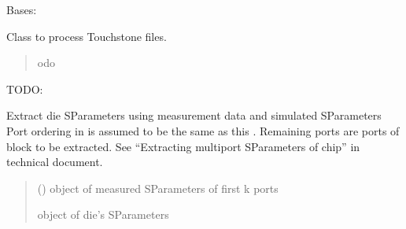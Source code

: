 \documentclass[letterpaper,10pt,english]{sphinxmanual}
\begin{document}
\begin{fulllineitems}
\label{\detokenize{touchstone:touchstone.spfile}}
\pysigstartsignatures
{}
\pysigstopsignatures
\sphinxAtStartPar
Bases: 

\sphinxAtStartPar
Class to process Touchstone files.
\begin{quote}

\sphinxAtStartPar
odo
\end{quote}

\sphinxAtStartPar
TODO:

\begin{fulllineitems}
\label{\detokenize{touchstone:touchstone.spfile.Extraction}}
\pysigstartsignatures
{}
\pysigstopsignatures
\sphinxAtStartPar
Extract die S\sphinxhyphen{}Parameters using measurement data and simulated S\sphinxhyphen{}Parameters
Port ordering in  is assumed to be the same as this .
Remaining ports are ports of block to be extracted.
See “Extracting multiport S\sphinxhyphen{}Parameters of chip” in technical document.
\begin{quote}\begin{description}
\sphinxAtStartPar
{} ({\hyperref[\detokenize{touchstone:touchstone.spfile}]{}}) \textendash{}  object of measured S\sphinxhyphen{}Parameters of first k ports

\sphinxAtStartPar
{} object of die’s S\sphinxhyphen{}Parameters

\sphinxAtStartPar
{\hyperref[\detokenize{touchstone:touchstone.spfile}]{}}


\end{description}
\end{quote}
\end{fulllineitems}
\end{fulllineitems}
\end{document}
